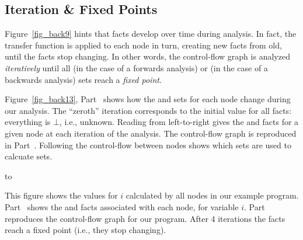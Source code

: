 \documentclass[12pt]{report}
\begin{document}
\subsection{Iteration \& Fixed Points}
\label{back_subsec_iter}

Figure~\ref{fig_back9} hints that facts
develop over time during analysis. In fact, the transfer function is
applied to each node in turn, creating new facts from old, until the
facts stop changing. In other words, the control-flow graph is
analyzed \emph{iteratively} until all \out (in the case of a forwards
analysis) or \inE (in the case of a backwards analysis) sets reach a
\emph{fixed point}.

Figure~\ref{fig_back13}, Part~ shows how the
\inE and \out sets for each node change during our
analysis. The ``zeroth'' iteration corresponds to the initial value
for all facts: everything is $\bot$, i.e., unknown. Reading from
left-to-right gives the \inE and \out facts for a given node at each
iteration of the analysis. The control-flow graph is reproduced in
Part~. Following the control-flow between nodes
shows which \out sets are used to calcuate \inE sets.

\begin{myfig}[tb]
  \setlength{\tabcolsep}{2pt}
  \hbox to 
  \caption{This figure shows the values for $i$ calculated by all nodes in our
    example program. Part~ shows the \inE and
    \out facts associated with each node, for variable $i$. Part~
    reproduces the control-flow graph for our program. After 4
    iterations the facts reach a fixed point (i.e., they stop
    changing).}
  \label{fig_back13}
\end{myfig}
\end{document}
